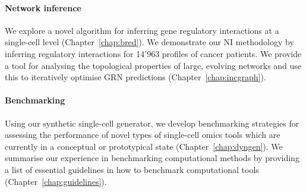 \paragraph{Network inference} We explore a novel algorithm for inferring gene regulatory interactions at a single-cell level (Chapter~\ref{chap:bred}). We demonstrate our NI methodology by inferring regulatory interactions for 14'963 profiles of cancer patients. We provide a tool for analysing the topological properties of large, evolving networks and use this to iteratively optimise GRN predictions (Chapter~\ref{chap:incgraph}).

\paragraph{Benchmarking} Using our synthetic single-cell generator, we develop benchmarking strategies for assessing the performance of novel types of single-cell omics tools which are currently in a conceptual or prototypical state (Chapter~\ref{chap:dyngen}). We summarise our experience in benchmarking computational methods by providing a list of essential guidelines in how to benchmark computational tools (Chapter~\ref{chap:guidelines}).



